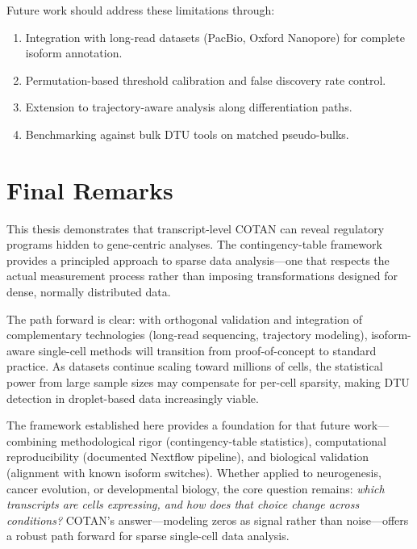Future work should address these limitations through:
\begin{enumerate}
    \item Integration with long-read datasets (PacBio, Oxford Nanopore) for complete isoform annotation.
    \item Permutation-based threshold calibration and false discovery rate control.
    \item Extension to trajectory-aware analysis along differentiation paths.
    \item Benchmarking against bulk DTU tools on matched pseudo-bulks.
\end{enumerate}

\section*{Final Remarks}

This thesis demonstrates that transcript-level COTAN can reveal regulatory programs hidden to gene-centric analyses. The contingency-table framework provides a principled approach to sparse data analysis---one that respects the actual measurement process rather than imposing transformations designed for dense, normally distributed data.

The path forward is clear: with orthogonal validation and integration of complementary technologies (long-read sequencing, trajectory modeling), isoform-aware single-cell methods will transition from proof-of-concept to standard practice. As datasets continue scaling toward millions of cells, the statistical power from large sample sizes may compensate for per-cell sparsity, making DTU detection in droplet-based data increasingly viable.

The framework established here provides a foundation for that future work---combining methodological rigor (contingency-table statistics), computational reproducibility (documented Nextflow pipeline), and biological validation (alignment with known isoform switches). Whether applied to neurogenesis, cancer evolution, or developmental biology, the core question remains: \textit{which transcripts are cells expressing, and how does that choice change across conditions?} COTAN's answer---modeling zeros as signal rather than noise---offers a robust path forward for sparse single-cell data analysis.